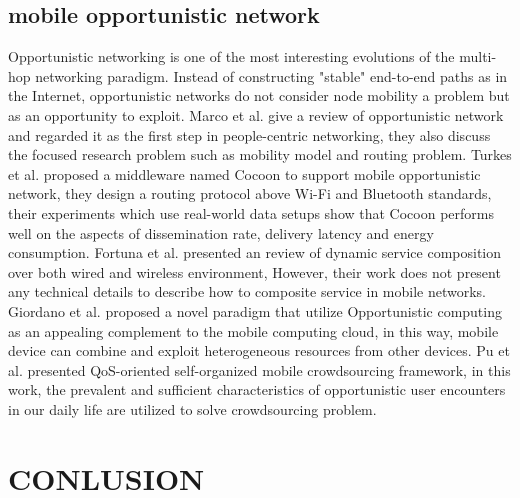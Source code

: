 \documentclass[10pt,journal,compsoc]{IEEEtran}
\begin{document}
\subsection{mobile opportunistic network}
Opportunistic networking is one of the most interesting evolutions of the multi-hop networking paradigm. Instead of constructing "stable" end-to-end paths as in the Internet, opportunistic networks do not consider node mobility a problem but as an opportunity to exploit. 
Marco et al. \cite{Conti2014} give a review of opportunistic network and regarded it as the first step in people-centric networking, they also discuss the focused research problem such as mobility model and routing problem.
Turkes et al. \cite{turkes2016cocoon} proposed a middleware named Cocoon to support mobile opportunistic network, they design a routing protocol above Wi-Fi and Bluetooth standards, their experiments which use real-world data setups show that Cocoon performs well on the aspects of dissemination rate, delivery latency and energy consumption.
Fortuna et al. \cite{fortuna2009dynamic} presented an review of dynamic service composition over both wired and wireless environment, However, their work does not present any technical details to describe how to composite service in mobile networks.
Giordano et al. \cite{Giordano2011} proposed a novel paradigm that utilize Opportunistic computing as an appealing complement to the mobile computing cloud, in this way, mobile device can combine and exploit heterogeneous resources from other devices.
Pu et al. \cite{Pu2017} presented QoS-oriented self-organized mobile crowdsourcing framework, in this work, the prevalent and sufficient characteristics of opportunistic user encounters in our daily life are utilized to solve crowdsourcing problem.
\section{CONLUSION}



\end{document}
